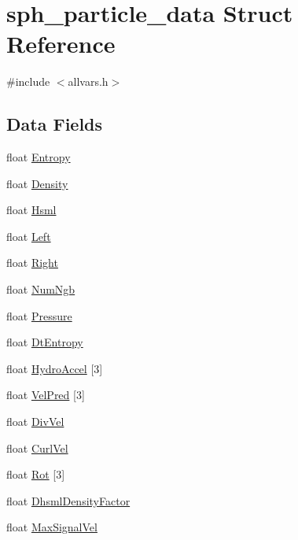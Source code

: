 \hypertarget{structsph__particle__data}{
\section{sph\_\-particle\_\-data Struct Reference}
\label{structsph__particle__data}
}


{\ttfamily \#include $<$allvars.h$>$}

\subsection*{Data Fields}
\begin{DoxyCompactItemize}
\item 
float \hyperlink{structsph__particle__data_a7cbe9bb2086f525f400b2c12103b3116}{Entropy}
\item 
float \hyperlink{structsph__particle__data_aaeca7f3efec44ebd5b7d36ce79d38779}{Density}
\item 
float \hyperlink{structsph__particle__data_af9efa599cdd656b26a0df5f89430b4d1}{Hsml}
\item 
float \hyperlink{structsph__particle__data_a05d75ccc7dbd52562b7211fc74e674af}{Left}
\item 
float \hyperlink{structsph__particle__data_ae21f207de0a8a6f53cc891a7556f2592}{Right}
\item 
float \hyperlink{structsph__particle__data_a8038c8b4be4a553e5c13c9b9e711c5c0}{NumNgb}
\item 
float \hyperlink{structsph__particle__data_a9201a97de5fe06f6ed6fcc33386eccda}{Pressure}
\item 
float \hyperlink{structsph__particle__data_a27aeefa50674867d3dec1c359b7191c8}{DtEntropy}
\item 
float \hyperlink{structsph__particle__data_aa3441b1ee8351048b3dcac10b36b0b6c}{HydroAccel} \mbox{[}3\mbox{]}
\item 
float \hyperlink{structsph__particle__data_a730acdc1da11f80da2214ebb76e6c2b3}{VelPred} \mbox{[}3\mbox{]}
\item 
float \hyperlink{structsph__particle__data_a1af47e5f5e7ef9e4a656411c468c8d14}{DivVel}
\item 
float \hyperlink{structsph__particle__data_a843c827a50c8783218cd850925deb575}{CurlVel}
\item 
float \hyperlink{structsph__particle__data_a6b9b7ed346c2d65d50dacd4b43cdd1d2}{Rot} \mbox{[}3\mbox{]}
\item 
float \hyperlink{structsph__particle__data_af49cca403dc402fdb0d0d481d49d7b53}{DhsmlDensityFactor}
\item 
float \hyperlink{structsph__particle__data_a86da008875968dfca41b35f4ca7f3164}{MaxSignalVel}
\end{DoxyCompactItemize}


